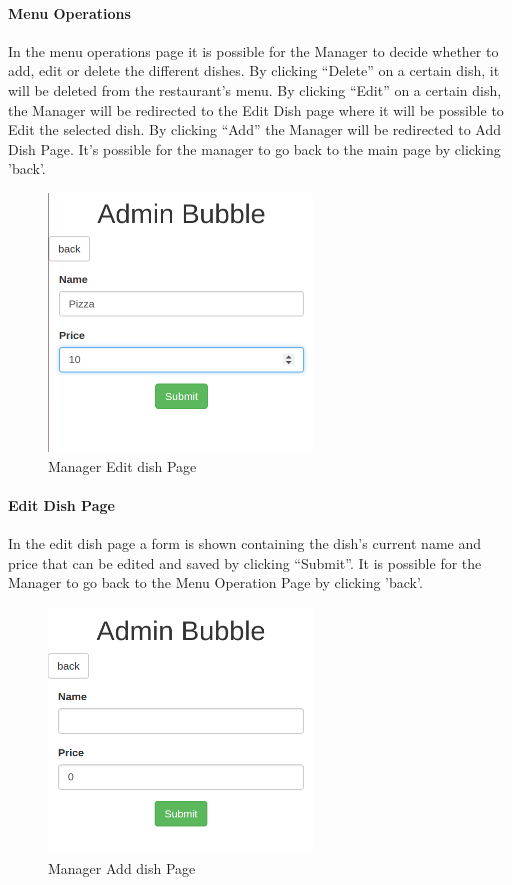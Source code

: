 \paragraph{Menu Operations}
In the menu operations page it is possible for the Manager to decide whether to add, edit or delete the different dishes.
By clicking ``Delete'' on a certain dish, it will be deleted from the restaurant's menu.
By clicking ``Edit'' on a certain dish, the Manager will be redirected to the Edit Dish page where it will be possible to Edit the selected dish.
By clicking ``Add'' the Manager will be redirected to Add Dish Page.
It's possible for the manager to go back to the main page by clicking 'back'.

\begin{figure}[H]
	\centering
	\includegraphics[width=7cm]{../../documenti/UserManualDemo/demo_screens/admin_edit.png}
	\caption{Manager Edit dish Page}
\end{figure}
\paragraph{Edit Dish Page}
In the edit dish page a form is shown containing the dish's current name and price that can be edited and saved by clicking ``Submit''.
It is possible for the Manager to go back to the Menu Operation Page by clicking 'back'.

\begin{figure}[H]
	\centering
	\includegraphics[width=7cm]{../../documenti/UserManualDemo/demo_screens/admin_add.png}
	\caption{Manager Add dish Page}
\end{figure}
